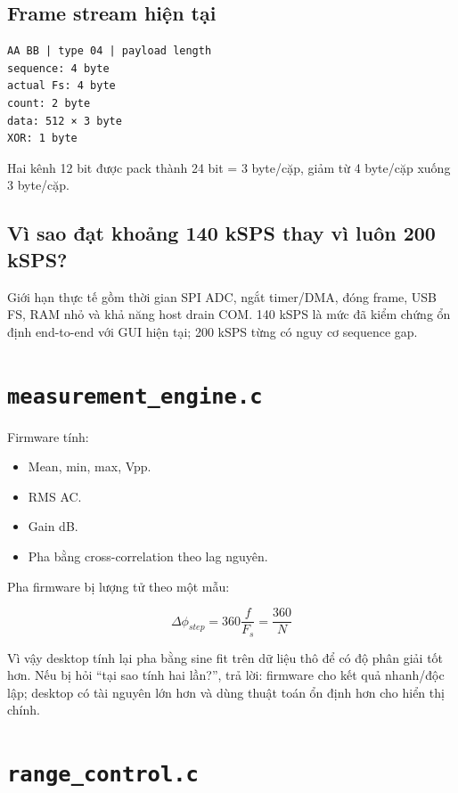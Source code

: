 \documentclass[12pt,a4paper,oneside]{article}
\newcommand{\inlinecode}[1]{\texttt{#1}}
\begin{document}
\subsection{Frame stream hiện tại}

\begin{Verbatim}[breaklines=true,breakanywhere=true,fontsize=\small]
AA BB | type 04 | payload length
sequence: 4 byte
actual Fs: 4 byte
count: 2 byte
data: 512 × 3 byte
XOR: 1 byte
\end{Verbatim}

Hai kênh 12 bit được pack thành 24 bit = 3 byte/cặp, giảm từ 4 byte/cặp xuống 3 byte/cặp.

\subsection{Vì sao đạt khoảng 140 kSPS thay vì luôn 200 kSPS?}

Giới hạn thực tế gồm thời gian SPI ADC, ngắt timer/DMA, đóng frame, USB FS, RAM nhỏ và khả năng host drain COM. 140 kSPS là mức đã kiểm chứng ổn định end-to-end với GUI hiện tại; 200 kSPS từng có nguy cơ sequence gap.

\section{\inlinecode{measurement\_engine.c}}

Firmware tính:

\begin{itemize}
\item Mean, min, max, Vpp.
\item RMS AC.
\item Gain dB.
\item Pha bằng cross-correlation theo lag nguyên.
\end{itemize}

Pha firmware bị lượng tử theo một mẫu:

\[
\Delta\phi_{step}=360\frac{f}{F_s}=\frac{360}{N}
\]

Vì vậy desktop tính lại pha bằng sine fit trên dữ liệu thô để có độ phân giải tốt hơn. Nếu bị hỏi “tại sao tính hai lần?”, trả lời: firmware cho kết quả nhanh/độc lập; desktop có tài nguyên lớn hơn và dùng thuật toán ổn định hơn cho hiển thị chính.

\section{\inlinecode{range\_control.c}}
\end{document}
